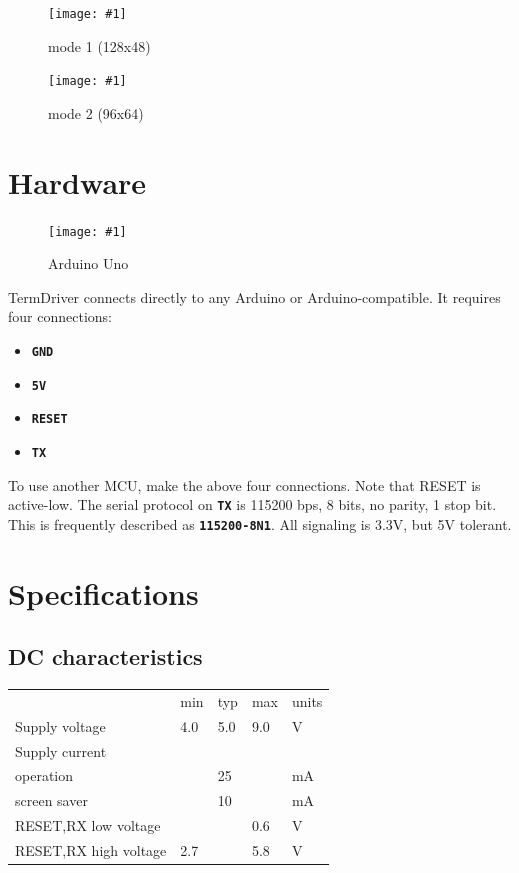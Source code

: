 \documentclass{article}
\newcommand{\heavyline}{\specialrule{1pt}{1pt}{1pt}}
\newcommand{\png}[2]{
\begin{figure}[H]
\begin{center}
\texttt{[image: \#1]}
\caption{#2}
\end{center}
\end{figure}
}
\newcommand{\mach}[1]{\texttt{\textbf{#1}}}
\begin{document}
\png{img/termdriver/moby1}{mode 1 (128x48)}
\png{img/termdriver/moby2}{mode 2 (96x64)}

\newpage
\section{Hardware}

\png{img/arduino}{Arduino Uno}

TermDriver connects directly to any Arduino or Arduino-compatible.
It requires four connections:

\begin{itemize}
\item \mach{GND}
\item \mach{5V}
\item \mach{RESET}
\item \mach{TX}
\end{itemize}

\noindent
To use another MCU, make the above four connections. Note that RESET is active-low.
The serial protocol on \mach{TX} is 115200 bps, 8 bits, no parity, 1 stop bit.
This is frequently described as \mach{115200-8N1}.
All signaling is 3.3V, but 5V tolerant.

\newpage
\hypertarget{technical-specifications}{}
\hypertarget{technical-specifications}{%
\section{Specifications}\label{electrical-characteristics}}

\subsection{DC characteristics}
\vspace{10 pt}
{\renewcommand{\arraystretch}{1.2}%

\begin{tabularx}{\linewidth}{XC{40pt}C{40pt}C{40pt}C{40pt}}
\heavyline
& min & typ & max & units \\ \heavyline

Supply voltage & 4.0 & 5.0 & 9.0 & V \\ \hline

Supply current & & & & \\
\hspace{10pt} operation & & 25 & & mA \\
\hspace{10pt} screen saver & & 10 & & mA \\ \hline

RESET,RX low voltage & & & 0.6 & V \\ \hline
RESET,RX high voltage & 2.7 &   & 5.8 & V \\ \hline
\end{tabularx}}
\vspace{10 pt}
\end{document}
